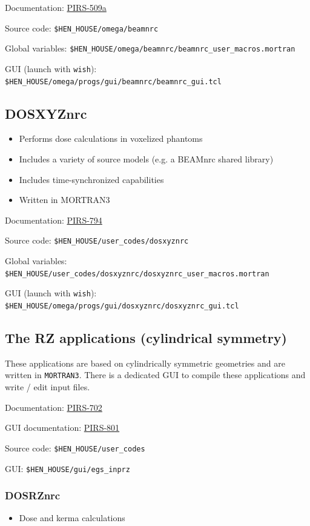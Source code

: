 \documentclass[12pt,twoside]{article}
\begin{document}
Documentation: \href{http://nrc-cnrc.github.io/EGSnrc/doc/pirs509a-beamnrc.pdf}{PIRS-509a}

Source code: \Verb+$HEN_HOUSE/omega/beamnrc+

Global variables: \Verb+$HEN_HOUSE/omega/beamnrc/beamnrc_user_macros.mortran+

GUI (launch with \Verb+wish+): \Verb+$HEN_HOUSE/omega/progs/gui/beamnrc/beamnrc_gui.tcl+

\subsection{DOSXYZnrc}
\begin{itemize}
\item Performs dose calculations in voxelized phantoms
\item Includes a variety of source models (e.g. a BEAMnrc shared library)
\item Includes time-synchronized capabilities
\item Written in MORTRAN3
\end{itemize}

Documentation: \href{http://nrc-cnrc.github.io/EGSnrc/doc/pirs794-dosxyznrc.pdf}{PIRS-794}

Source code: \Verb+$HEN_HOUSE/user_codes/dosxyznrc+

Global variables: \Verb+$HEN_HOUSE/user_codes/dosxyznrc/dosxyznrc_user_macros.mortran+

GUI (launch with \Verb+wish+): \Verb+$HEN_HOUSE/omega/progs/gui/dosxyznrc/dosxyznrc_gui.tcl+

\clearpage
\subsection{The RZ applications (cylindrical symmetry)}
These applications are based on cylindrically symmetric geometries and are
written in \Verb+MORTRAN3+. There is a dedicated GUI to compile these
applications and write / edit input files.

Documentation: \href{http://nrc-cnrc.github.io/EGSnrc/doc/pirs702-egsnrc-codes.pdf}{PIRS-702}

GUI documentation: \href{http://nrc-cnrc.github.io/EGSnrc/doc/pirs801-egsinprz.pdf}{PIRS-801}

Source code: \Verb+$HEN_HOUSE/user_codes+

GUI: \Verb+$HEN_HOUSE/gui/egs_inprz+

\subsubsection{DOSRZnrc}
\begin{itemize}
\item Dose and kerma calculations
\end{itemize}
\end{document}
